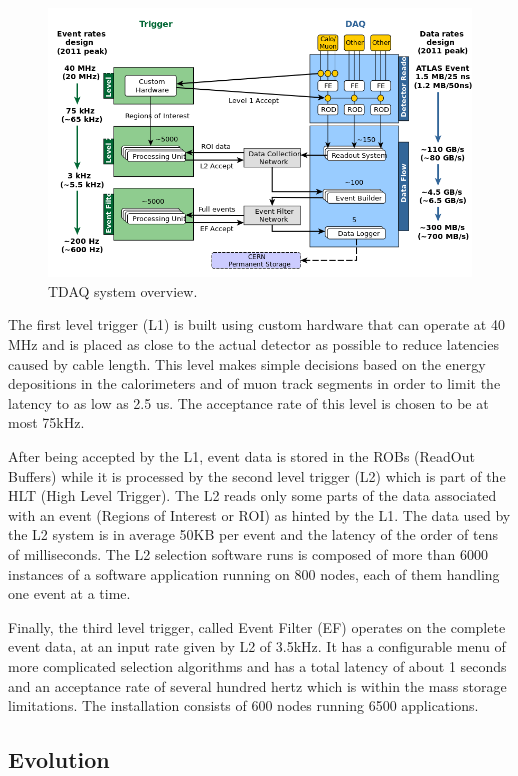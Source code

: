 \begin{figure}[ht!]
\centering
\includegraphics[scale=0.5]{Images/Trigger.png}
\caption{TDAQ system overview.}
\end{figure}

The first level trigger (L1) is built using custom hardware that can operate at 40 MHz and is placed as close to the actual detector as possible to reduce latencies caused by cable length. This level makes simple decisions based on the energy depositions in the calorimeters and of muon track segments in order to limit the latency to as low as 2.5 us. The acceptance rate of this level is chosen to be at most 75kHz. 

After being accepted by the L1, event data is stored in the ROBs (ReadOut Buffers) while it is processed by the second level trigger (L2) which is part of the HLT (High Level Trigger). The L2 reads only some parts of the data associated with an event (Regions of Interest or ROI) as hinted by the L1. The data used by the L2 system is in average 50KB per event and the latency of the order of tens of milliseconds. The L2 selection software runs is composed of more than 6000 instances of a software application running on 800 nodes, each of them handling one event at a time. 

Finally, the third level trigger, called Event Filter (EF) operates on the complete event data, at an input rate given by L2 of 3.5kHz. It has a configurable menu of more complicated selection algorithms and has a total latency of about 1 seconds and an acceptance rate of several hundred hertz which is within the mass storage limitations. The installation consists of 600 nodes running 6500 applications.

\subsection*{Evolution}

